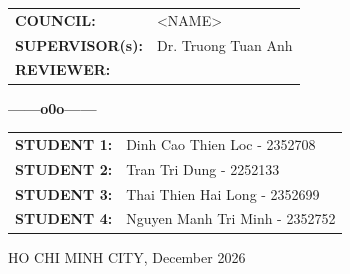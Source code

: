 \begin{titlepage}
\begin{center}
    {\fontsize{13pt}{16pt}\selectfont
    \begin{tabular}{l l}
        \textbf{COUNCIL:} & <NAME> \\
        \textbf{SUPERVISOR(s):} & Dr. Truong Tuan Anh \\
        \textbf{REVIEWER:} &  \\
    \end{tabular}\par}
    
    \vspace{0.15cm}
    \textbf{------o0o------}
    \vspace{0.15cm}

    {\fontsize{13pt}{16pt}\selectfont
    \begin{tabular}{l l}
        \textbf{STUDENT 1:} & Dinh Cao Thien Loc - 2352708 \\
        \textbf{STUDENT 2:} & Tran Tri Dung - 2252133 \\ 
        \textbf{STUDENT 3:} & Thai Thien Hai Long - 2352699 \\ 
        \textbf{STUDENT 4:} & Nguyen Manh Tri Minh - 2352752 
    \end{tabular}\par}

    \vfill

    {\fontsize{13pt}{16pt}\selectfont HO CHI MINH CITY, December 2026\par}
    \vspace*{0.3cm}

\end{center}

\end{titlepage}
